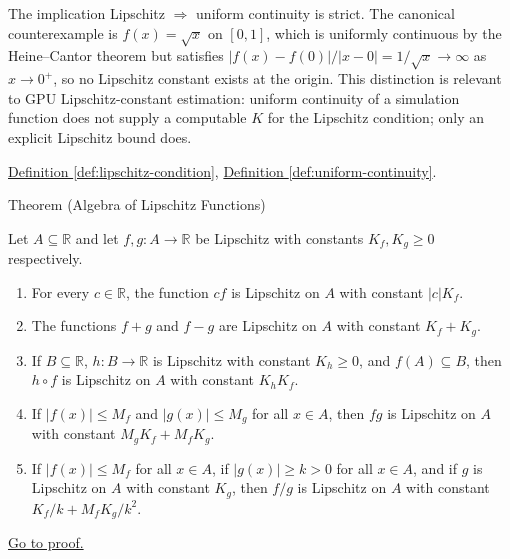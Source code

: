 \begin{remark*}
The implication Lipschitz $\Rightarrow$ uniform continuity is strict. The canonical counterexample is $f(x)=\sqrt{x}$ on $[0,1]$, which is uniformly continuous by the Heine--Cantor theorem but satisfies $|f(x)-f(0)|/|x-0| = 1/\sqrt{x} \to \infty$ as $x \to 0^+$, so no Lipschitz constant exists at the origin. This distinction is relevant to GPU Lipschitz-constant estimation: uniform continuity of a simulation function does not supply a computable $K$ for the Lipschitz condition; only an explicit Lipschitz bound does.
\end{remark*}

\begin{dependencies}
\hyperref[def:lipschitz-condition]{Definition \ref*{def:lipschitz-condition}}, \hyperref[def:uniform-continuity]{Definition \ref*{def:uniform-continuity}}.
\end{dependencies}


\begin{theorembox}{Theorem (Algebra of Lipschitz Functions)}
\begin{theorem}
\label{thm:algebra-of-lipschitz-functions}
Let $A\subseteq \mathbb{R}$ and let $f,g:A\to\mathbb{R}$ be Lipschitz with constants $K_f,K_g\ge 0$ respectively.
\begin{enumerate}[label=(\alph*)]
\item For every $c\in\mathbb{R}$, the function $cf$ is Lipschitz on $A$ with constant $|c|K_f$.
\item The functions $f+g$ and $f-g$ are Lipschitz on $A$ with constant $K_f+K_g$.
\item If $B\subseteq\mathbb{R}$, $h:B\to\mathbb{R}$ is Lipschitz with constant $K_h\ge 0$, and $f(A)\subseteq B$, then $h\circ f$ is Lipschitz on $A$ with constant $K_hK_f$.
\item If $|f(x)|\le M_f$ and $|g(x)|\le M_g$ for all $x\in A$, then $fg$ is Lipschitz on $A$ with constant $M_gK_f+M_fK_g$.
\item If $|f(x)|\le M_f$ for all $x\in A$, if $|g(x)|\ge k>0$ for all $x\in A$, and if $g$ is Lipschitz on $A$ with constant $K_g$, then $f/g$ is Lipschitz on $A$ with constant $K_f/k + M_fK_g/k^2$.
\end{enumerate}
\hyperref[prf:algebra-of-lipschitz-functions]{Go to proof.}
\end{theorem}
\end{theorembox}

